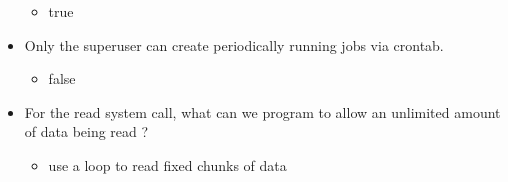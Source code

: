 \documentclass{report}
\begin{document}
\begin{itemize}
\begin{itemize}
                \item true 
            \end{itemize}
        \item Only the superuser can create periodically running jobs via crontab.
            \begin{itemize}
                \item false 
            \end{itemize}
        \item For the read system call, what can we program to allow an unlimited amount of data being read ?
            \begin{itemize}
                \item use a loop to read fixed chunks of data 
            \end{itemize}
    \end{itemize}
    
\end{document}
